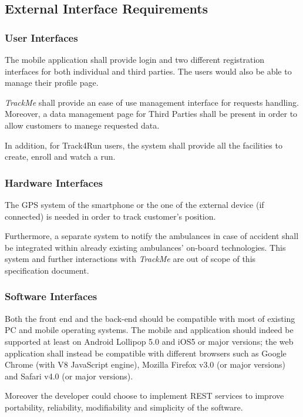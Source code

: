 \documentclass[a4paper]{article}
\begin{document}
    \subsection{External Interface Requirements}
        
        \subsubsection{User Interfaces}
        
        The mobile application shall provide login and two different registration interfaces for both individual and third parties. The users would also be able to manage their profile page.
        
        \textit{TrackMe} shall provide an ease of use management interface for requests handling. Moreover, a data management page for Third Parties shall be present in order to allow customers to manege requested data.
        
        In addition, for Track4Run users, the system shall provide all the facilities to create, enroll and watch a run.
        
        \subsubsection{Hardware Interfaces}
        The GPS system of the smartphone or the one of the external device (if connected) is needed in order to track customer's position.
        
        Furthermore, a separate system to notify the ambulances in case of accident shall be integrated within already existing ambulances' on-board technologies. This system and further interactions with \textit{TrackMe} are out of scope of this specification document.
        
        \subsubsection{Software Interfaces}
        Both the front end and the back-end should be compatible with most of existing PC and mobile operating systems. The mobile and application should indeed be supported at least on Android Lollipop 5.0 and iOS5 or major versions; the web application shall instead be compatible with different browsers such as Google Chrome (with V8 JavaScript engine), Mozilla Firefox v3.0 (or major versions) and Safari v4.0 (or major versions).
        
        Moreover the developer could choose to implement REST services to improve portability, reliability, modifiability and simplicity of the software.
        
\end{document}
